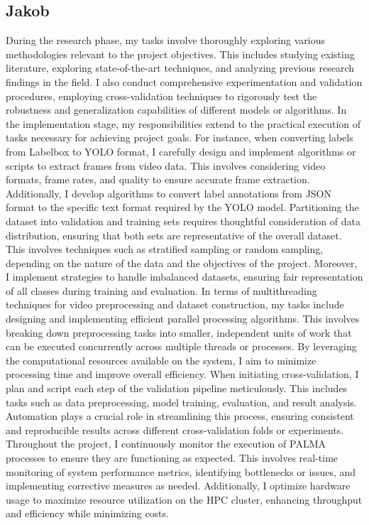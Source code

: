 \documentclass[sigchi,screen]{acmart}
\begin{document}
\subsection{Jakob}
During the research phase, my tasks involve thoroughly exploring various methodologies relevant to the project objectives. This includes studying existing literature, exploring state-of-the-art techniques, and analyzing previous research findings in the field. I also conduct comprehensive experimentation and validation procedures, employing cross-validation techniques to rigorously test the robustness and generalization capabilities of different models or algorithms. In the implementation stage, my responsibilities extend to the practical execution of tasks necessary for achieving project goals. For instance, when converting labels from Labelbox to YOLO format, I carefully design and implement algorithms or scripts to extract frames from video data. This involves considering video formats, frame rates, and quality to ensure accurate frame extraction. Additionally, I develop algorithms to convert label annotations from JSON format to the specific text format required by the YOLO model. Partitioning the dataset into validation and training sets requires thoughtful consideration of data distribution, ensuring that both sets are representative of the overall dataset. This involves techniques such as stratified sampling or random sampling, depending on the nature of the data and the objectives of the project. Moreover, I implement strategies to handle imbalanced datasets, ensuring fair representation of all classes during training and evaluation. In terms of multithreading techniques for video preprocessing and dataset construction, my tasks include designing and implementing efficient parallel processing algorithms. This involves breaking down preprocessing tasks into smaller, independent units of work that can be executed concurrently across multiple threads or processes. By leveraging the computational resources available on the system, I aim to minimize processing time and improve overall efficiency. When initiating cross-validation, I plan and script each step of the validation pipeline meticulously. This includes tasks such as data preprocessing, model training, evaluation, and result analysis. Automation plays a crucial role in streamlining this process, ensuring consistent and reproducible results across different cross-validation folds or experiments. Throughout the project, I continuously monitor the execution of PALMA processes to ensure they are functioning as expected. This involves real-time monitoring of system performance metrics, identifying bottlenecks or issues, and implementing corrective measures as needed. Additionally, I optimize hardware usage to maximize resource utilization on the HPC cluster, enhancing throughput and efficiency while minimizing costs.
\newcommand{\escapeunderscore}[1]{%
    \StrSubstitute{#1}{_}{\string_}%
}
\newcommand{\substringtwenty}[1]{\StrMid{#1}{2}{11}}
\end{document}

